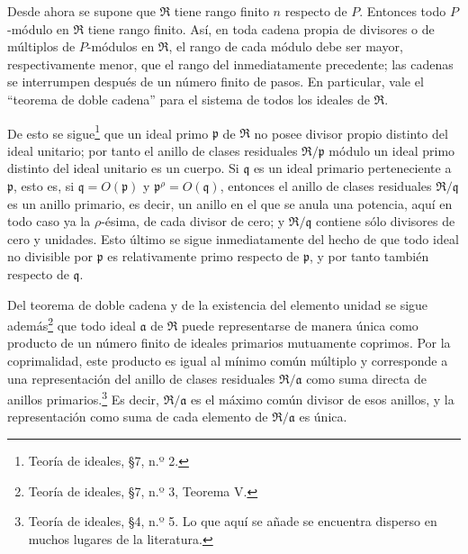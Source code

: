 \documentclass[11pt]{article}
\begin{document}
Desde ahora se supone que $\mathfrak R$ tiene rango finito $n$ respecto de $P$. Entonces todo $P$-módulo en $\mathfrak R$ tiene rango finito. Así, en toda cadena propia de divisores o de múltiplos de $P$-módulos en $\mathfrak R$, el rango de cada módulo debe ser mayor, respectivamente menor, que el rango del inmediatamente precedente; las cadenas se interrumpen después de un número finito de pasos. En particular, vale el ``teorema de doble cadena'' para el sistema de todos los ideales de $\mathfrak R$.

De esto se sigue\footnote{Teoría de ideales, \S 7, n.º 2.} que un ideal primo $\mathfrak p$ de $\mathfrak R$ no posee divisor propio distinto del ideal unitario; por tanto el anillo de clases residuales $\mathfrak R/\mathfrak p$ módulo un ideal primo distinto del ideal unitario es un cuerpo. Si $\mathfrak q$ es un ideal primario perteneciente a $\mathfrak p$, esto es, si $\mathfrak q=O(\mathfrak p)$ y $\mathfrak p^{\rho}=O(\mathfrak q)$, entonces el anillo de clases residuales $\mathfrak R/\mathfrak q$ es un anillo primario, es decir, un anillo en el que se anula una potencia, aquí en todo caso ya la $\rho$-ésima, de cada divisor de cero; y $\mathfrak R/\mathfrak q$ contiene sólo divisores de cero y unidades. Esto último se sigue inmediatamente del hecho de que todo ideal no divisible por $\mathfrak p$ es relativamente primo respecto de $\mathfrak p$, y por tanto también respecto de $\mathfrak q$.

Del teorema de doble cadena y de la existencia del elemento unidad se sigue además\footnote{Teoría de ideales, \S 7, n.º 3, Teorema V.} que todo ideal $\mathfrak a$ de $\mathfrak R$ puede representarse de manera única como producto de un número finito de ideales primarios mutuamente coprimos. Por la coprimalidad, este producto es igual al mínimo común múltiplo y corresponde a una representación del anillo de clases residuales $\mathfrak R/\mathfrak a$ como suma directa de anillos primarios.\footnote{Teoría de ideales, \S 4, n.º 5. Lo que aquí se añade se encuentra disperso en muchos lugares de la literatura.} Es decir, $\mathfrak R/\mathfrak a$ es el máximo común divisor de esos anillos, y la representación como suma de cada elemento de $\mathfrak R/\mathfrak a$ es única.
\end{document}
